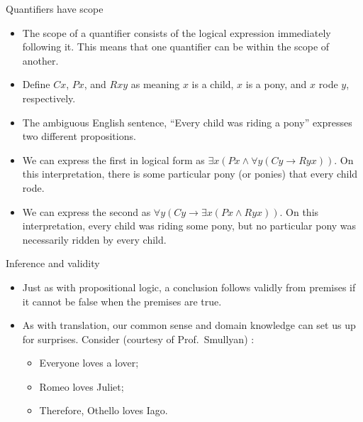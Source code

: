 \documentclass[
  ignorenonframetext,
]{beamer}
\providecommand{\tightlist}{%
  \setlength{\itemsep}{0pt}\setlength{\parskip}{0pt}}
\begin{document}
\begin{frame}{Quantifiers have scope}
\protect\hypertarget{quantifiers-have-scope}{}

\begin{itemize}[<+->]
\tightlist
\item
  The scope of a quantifier consists of the logical expression
  immediately following it. This means that one quantifier can be within
  the scope of another.
\item
  Define \(Cx\), \(Px\), and \(Rxy\) as meaning \(x\) is a child, \(x\)
  is a pony, and \(x\) rode \(y\), respectively.
\item
  The ambiguous English sentence, ``Every child was riding a pony''
  expresses two different propositions.
\item
  We can express the first in logical form as
  \({\exists}x (Px \wedge {\forall}y (Cy \rightarrow Ryx))\). On this
  interpretation, there is some particular pony (or ponies) that every
  child rode.
\item
  We can express the second as
  \({\forall}y (Cy \rightarrow {\exists}x (Px \wedge Ryx))\). On this
  interpretation, every child was riding some pony, but no particular
  pony was necessarily ridden by every child.
\end{itemize}

\end{frame}

\begin{frame}[fragile]{Inference and validity}
\protect\hypertarget{inference-and-validity}{}

\begin{itemize}[<+->]
\item
  Just as with propositional logic, a conclusion follows validly from
  premises if it cannot be false when the premises are true.
\item
  As with translation, our common sense and domain knowledge can set us
  up for surprises. Consider (courtesy of Prof.~Smullyan) :
\begin{itemize}
 \item Everyone loves a lover;
 \item Romeo loves Juliet;
 \item Therefore, Othello loves Iago.
\end{itemize}
\end{itemize}

\end{frame}
\end{document}
